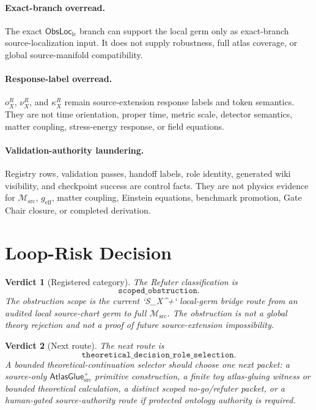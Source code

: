 \documentclass[11pt]{article}
\newcommand{\ObsLocLC}{\mathsf{ObsLoc}_{\mathrm{lc}}}
\newcommand{\Msrc}{\mathcal{M}_{\mathrm{src}}}
\newcommand{\geff}{g_{\mathrm{eff}}}
\newcommand{\AtlasGlue}{\mathsf{AtlasGlue}_{\mathrm{src}}^{+}}
\newtheorem{verdict}{Verdict}
\begin{document}
\paragraph{Exact-branch overread.}
The exact \(\ObsLocLC\) branch can support the local germ only as exact-branch
source-localization input. It does not supply robustness, full atlas coverage,
or global source-manifold compatibility.

\paragraph{Response-label overread.}
\(o_X^R\), \(\nu_X^R\), and \(\kappa_X^R\) remain source-extension response
labels and token semantics. They are not time orientation, proper time, metric
scale, detector semantics, matter coupling, stress-energy response, or field
equations.

\paragraph{Validation-authority laundering.}
Registry rows, validation passes, handoff labels, role identity, generated
wiki visibility, and checkpoint success are control facts. They are not
physics evidence for \(\Msrc\), \(\geff\), matter coupling, Einstein
equations, benchmark promotion, Gate Chair closure, or completed derivation.

\section{Loop-Risk Decision}

\begin{verdict}[Registered category]
The Refuter classification is
\[
  \texttt{scoped\_obstruction}.
\]
The obstruction scope is the current `S_X^+` local-germ bridge route from an
audited local source-chart germ to full \(\Msrc\). The obstruction is not a
global theory rejection and not a proof of future source-extension
impossibility.
\end{verdict}

\begin{verdict}[Next route]
The next route is
\[
  \texttt{theoretical\_decision\_role\_selection}.
\]
A bounded theoretical-continuation selector should choose one next packet:
a source-only \(\AtlasGlue\) primitive construction, a finite toy
atlas-gluing witness or bounded theoretical calculation, a distinct scoped
no-go/refuter packet, or a human-gated source-authority route if protected
ontology authority is required.
\end{verdict}
\end{document}
